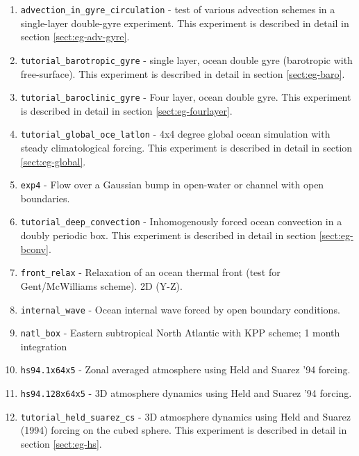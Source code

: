\begin{enumerate}
  
\item \texttt{advection\_in\_gyre\_circulation} - test of various
  advection schemes in a single-layer double-gyre experiment.
  This experiment is described in detail in section
  \ref{sect:eg-adv-gyre}.

\item \texttt{tutorial\_barotropic\_gyre} - single layer, ocean double
  gyre (barotropic with free-surface). This experiment is described in
  detail in section \ref{sect:eg-baro}.

\item \texttt{tutorial\_baroclinic\_gyre} - Four layer, ocean double
  gyre. This experiment is described in detail in section
  \ref{sect:eg-fourlayer}.

\item \texttt{tutorial\_global\_oce\_latlon} - 4x4 degree global ocean
  simulation with steady climatological forcing. This experiment is
  described in detail in section \ref{sect:eg-global}.

\item \texttt{exp4} - Flow over a Gaussian bump in open-water or
  channel with open boundaries.
  
\item \texttt{tutorial\_deep\_convection} - Inhomogenously forced
  ocean convection in a doubly periodic box. This experiment is
  described in detail in section \ref{sect:eg-bconv}.

\item \texttt{front\_relax} - Relaxation of an ocean thermal front
  (test for Gent/McWilliams scheme). 2D (Y-Z).

\item \texttt{internal\_wave} - Ocean internal wave forced by open
  boundary conditions.
  
\item \texttt{natl\_box} - Eastern subtropical North Atlantic with KPP
  scheme; 1 month integration
  
\item \texttt{hs94.1x64x5} - Zonal averaged atmosphere using Held and
  Suarez '94 forcing.
  
\item \texttt{hs94.128x64x5} - 3D atmosphere dynamics using Held and
  Suarez '94 forcing.
  
\item \texttt{tutorial\_held\_suarez\_cs} - 3D atmosphere dynamics
  using Held and Suarez (1994) forcing on the cubed sphere.  This
  experiment is described in detail in section \ref{sect:eg-hs}.
  

\end{enumerate}
